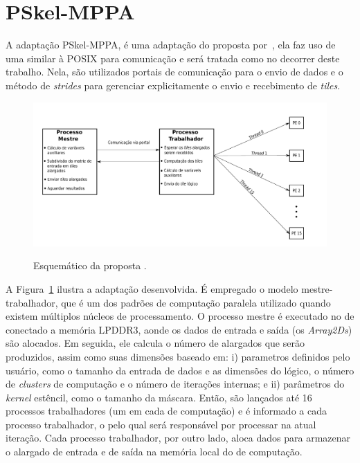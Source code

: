 \section{PSkel-MPPA}
\label{sec:pskel-mppa}

A adaptação PSkel-MPPA, é uma adaptação do \pskel proposta por~\cite{wscad2017}, ela faz uso de uma \api similar à POSIX \ipc para comunicação e será tratada como \ipc no decorrer deste trabalho. Nela, são utilizados portais de comunicação para o envio de dados e o método de \textit{strides}  para gerenciar explicitamente o envio e recebimento de \textit{tiles}.

\begin{figure}
    \centering
    \caption{Esquemático da proposta \pskelmppa.}
    \includegraphics[width=1\textwidth]{figs/visaoGeralPSKELMPPATrabalhador.pdf} \\
    \label{fig:visaoGeralPSkelMPPA}
\end{figure}


A Figura~\ref{fig:visaoGeralPSkelMPPA} ilustra a adaptação
desenvolvida. É empregado o modelo mestre-trabalhador, que é um dos padrões de computação paralela utilizado quando existem múltiplos núcleos de processamento. O processo mestre é executado no \cluster de \io conectado a memória LPDDR3, aonde os dados de entrada e saída (os \emph{Array2Ds}) são alocados. Em seguida, ele calcula o número de \tiles alargados que serão produzidos, assim como suas dimensões baseado em: i) parametros definidos pelo usuário, como o tamanho da entrada de dados e as dimensões do \tile lógico, o número de \emph{clusters} de computação e o número de iterações internas; e ii) parâmetros do \emph{kernel} estêncil, como o tamanho da máscara. Então, são lançados até 16 processos trabalhadores (um em cada \cluster de computação) e é informado a cada processo trabalhador, o \tile pelo qual será responsável por processar na atual iteração. Cada processo trabalhador, por outro lado, aloca dados para armazenar o \tile alargado de entrada e de saída na memória local do \cluster de computação.

